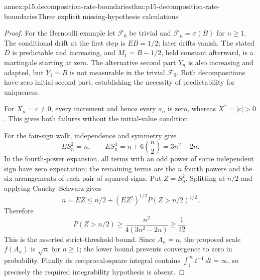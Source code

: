 \begin{annexitem}{annex:p15.decomposition-rate-boundaries}{thm:p15-decomposition-rate-boundaries}{Three explicit missing-hypothesis calculations}
\begin{proof}
For the Bernoulli example let \(\mathcal F_0\) be trivial and
\(\mathcal F_n=\sigma(B)\) for \(n\geq1\).
The conditional drift at the first step is \(EB=1/2\);
later drifts vanish. The stated \(D\) is predictable and
increasing, and \(M_1=B-1/2\), held constant afterward,
is a martingale starting at zero.
The alternative second part \(Y_n\) is also increasing and
adapted, but \(Y_1=B\) is not measurable in the trivial
\(\mathcal F_0\). Both decompositions have zero initial
second part, establishing the necessity of predictability for uniqueness.

For \(X_n=c\ne0\), every increment and hence every \(a_n\)
is zero, whereas \(X^*=|c|>0\).
This gives both failures without the initial-value condition.

For the fair-sign walk, independence and symmetry give
\[
                         ES_n^2=n,\qquad
                         ES_n^4=n+6\binom n2=3n^2-2n.
\]
In the fourth-power expansion, all terms with an odd power
of some independent sign have zero expectation; the remaining
terms are the \(n\) fourth powers and the six arrangements
of each pair of squared signs.
Put \(Z=S_n^2\). Splitting at \(n/2\) and applying
Cauchy--Schwarz gives
\[
 n=EZ\leq n/2+
             (EZ^2)^{1/2}P(Z>n/2)^{1/2}.
\]
Therefore
\[
                 P(Z>n/2)\geq
                     \frac{n^2}{4(3n^2-2n)}\geq\frac1{12}.
\]
This is the asserted strict-threshold bound.
Since \(A_n=n\), the proposed scale \(f(A_n)\) is \(\sqrt n\)
for \(n\geq1\); the lower bound prevents convergence to zero
in probability. Finally its reciprocal-square integral
contains \(\int_1^\infty t^{-1}\,dt=\infty\),
so precisely the required integrability hypothesis is absent.
\end{proof}
\end{annexitem}
